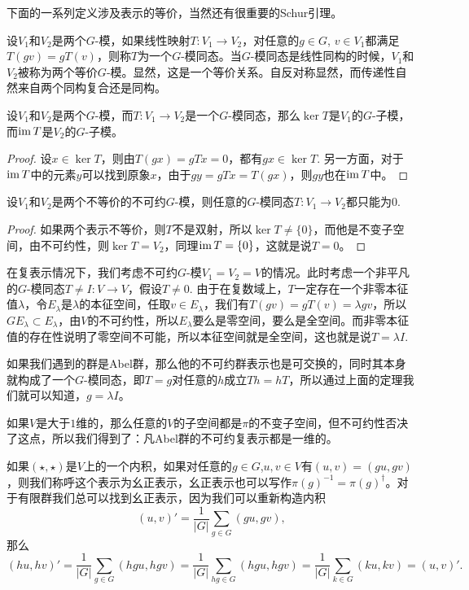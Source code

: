 下面的一系列定义涉及表示的等价，当然还有很重要的Schur引理。

\begin{para}
设$V_1$和$V_2$是两个$G$-模，如果线性映射$T:V_1\to V_2$，对任意的$g\in G$, $v\in V_1$都满足$T(gv)=gT(v)$，则称$T$为一个$G$-模同态。当$G$-模同态是线性同构的时候，$V_1$和$V_2$被称为两个等价$G$-模。显然，这是一个等价关系。自反对称显然，而传递性自然来自两个同构复合还是同构。
\end{para}

\begin{lem}
设$V_1$和$V_2$是两个$G$-模，而$T:V_1\to V_2$是一个$G$-模同态，那么$\ker T$是$V_1$的$G$-子模，而$\operatorname{im} T$是$V_2$的$G$-子模。
\end{lem}

\begin{proof}
设$x\in \ker T$，则由$T(gx)=gTx=0$，都有$gx\in \ker T$. 另一方面，对于$\operatorname{im} T$中的元素$y$可以找到原象$x$，由于$gy=gTx=T(gx)$，则$gy$也在$\operatorname{im} T$中。
\end{proof}

\begin{lem}[Schur引理]
设$V_1$和$V_2$是两个不等价的不可约$G$-模，则任意的$G$-模同态$T:V_1\to V_2$都只能为$0$.
\end{lem}

\begin{proof}
如果两个表示不等价，则$T$不是双射，所以$\ker T\neq \{0\}$，而他是不变子空间，由不可约性，则$\ker T= V_2$，同理$\operatorname{im}  T= \{0\}$，这就是说$T=0$。
\end{proof}

在复表示情况下，我们考虑不可约$G$-模$V_1=V_2=V$的情况。此时考虑一个非平凡的$G$-模同态$T\neq I:V\to V$，假设$T\neq 0$. 由于在复数域上，$T$一定存在一个非零本征值$\lambda$，令$E_\lambda$是$\lambda$的本征空间，任取$v\in E_\lambda$，我们有$T(gv)=g T(v)=\lambda gv$，所以$GE_\lambda\subset E_\lambda$，由$V$的不可约性，所以$E_\lambda$要么是零空间，要么是全空间。而非零本征值的存在性说明了零空间不可能，所以本征空间就是全空间，这也就是说$T=\lambda I$.

\para 如果我们遇到的群是Abel群，那么他的不可约群表示也是可交换的，同时其本身就构成了一个$G$-模同态，即$T=g$对任意的$h$成立$Th=h T$，所以通过上面的定理我们就可以知道，$g=\lambda I$。

如果$V$是大于$1$维的，那么任意的$V$的子空间都是$\pi$的不变子空间，但不可约性否决了这点，所以我们得到了：凡Abel群的不可约复表示都是一维的。
\endpara

\para 如果$(\star,\star)$是$V$上的一个内积，如果对任意的$g\in G$,$u,v\in V$有$(u,v)=(gu,gv)$，则我们称呼这个表示为幺正表示，幺正表示也可以写作$\pi(g)^{-1}=\pi(g)^\dag$。对于有限群我们总可以找到幺正表示，因为我们可以重新构造内积
\[
	(u,v)'=\frac{1}{|G|}\sum_{g\in G}(gu,gv),
\]
那么
\[
	(hu,hv)'=\frac{1}{|G|}\sum_{g\in G}(hgu,hgv)=\frac{1}{|G|}\sum_{hg\in G}(hgu,hgv)=\frac{1}{|G|}\sum_{k\in G}(ku,kv)=(u,v)'.
\]
\endpara

